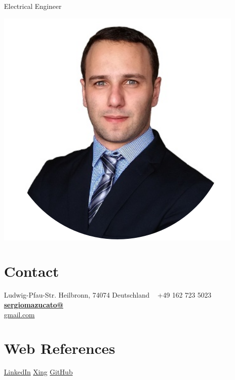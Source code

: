 \documentclass[]{friggeri-cv}
\begin{document}
      {Electrical Engineer}
      

\begin{aside}
  \includegraphics[scale=0.32]{img/linkedin_.png}
  \section{Contact}
    Ludwig-Pfau-Str.
    Heilbronn, 74074
    Deutschland
    ~
    +49 162 723 5023
    \href{mailto:sergiomazucato@gmail.com}{\textbf{sergiomazucato@}\\gmail.com}
    ~
  \section{Web References}
    \href{https://www.linkedin.com/in/sergiomazucato/}{LinkedIn}
    \href{https://www.xing.com/profile/Sergio_Mazucato}{Xing}
    \href{https://github.com/sergiomazucato}{GitHub}
    ~

\end{aside}
\end{document}
